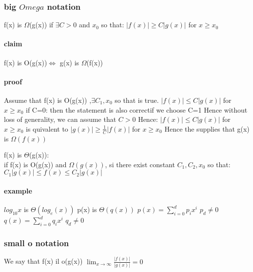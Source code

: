 \documentclass[a4paper,10pt]{article}
\begin{document}
{\subsubsection{big $Omega$ notation}
f(x) is $\Omega$(g(x)) if $\exists C>0$ and $x_0$ so that:
\newline
$|f(x)|\geq C|g(x)|$ for $x\geq x_0$
\paragraph{claim}
f(x) is O(g(x))$\Leftrightarrow$ g(x) is $\Omega$(f(x))
\paragraph{proof}
Assume that f(x) is O(g(x)) ,$\exists C_1,x_0$ so that is true.
\newline
$|f(x)|\leq C|g(x)|$ for $x\geq x_0$
\newline
if C=0:
\newline
then the statement is also correctif we choose C=1
\newline
Hence without loss of generality, we can assume that $C>0$ Hence:
\newline
$|f(x)|\leq C|g(x)|$ for $x\geq x_0$ is quivalent to
\newline
$|g(x)|\geq \frac{1}{C}|f(x)|$ for $x\geq x_0$
\newline
Hence the supplies that g(x) is $\Omega(f(x))$
\begin{description}
 \item f(x) is $\Theta$(g(x)):\\{if f(x) is O(g(x)) and $\Omega(g(x))$, si there exist constant $C_1,C_2,x_0$ so that: $C_1|g(x)|\leq f(x)\leq C_2|g(x)|$}
\end{description}
\paragraph{example}
$log_{10}x$ is $\Theta(log_{e}(x))$
\newline
p(x) is $\Theta(q(x))$
\newline
$p(x)=\sum_{i=0}^dp_ix^i$ $p_d\neq0$
\newline
$q(x)=\sum_{i=0}^dq_ix^i$ $q_d\neq 0$
\subsubsection{small o notation}
We say that f(x) il o(g(x))
\newline
$\lim_{x\to \infty}\frac{|f(x)|}{|g(x)|}=0$
}
\end{document}

